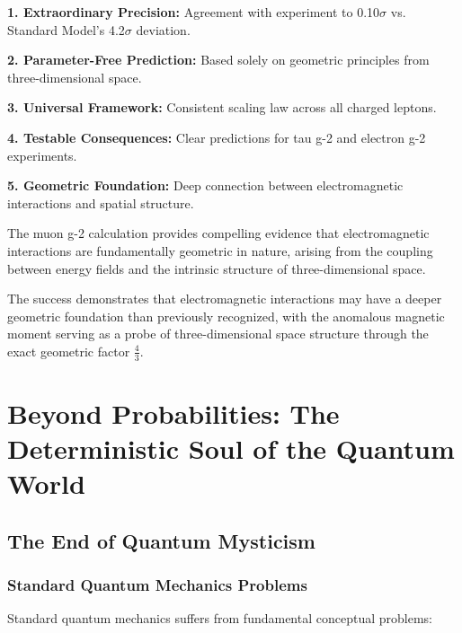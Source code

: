 \documentclass[12pt,a4paper]{report}
\begin{document}
	\textbf{1. Extraordinary Precision:}
	Agreement with experiment to 0.10$\sigma$ vs. Standard Model's 4.2$\sigma$ deviation.
	
	\textbf{2. Parameter-Free Prediction:}
	Based solely on geometric principles from three-dimensional space.
	
	\textbf{3. Universal Framework:}
	Consistent scaling law across all charged leptons.
	
	\textbf{4. Testable Consequences:}
	Clear predictions for tau g-2 and electron g-2 experiments.
	
	\textbf{5. Geometric Foundation:}
	Deep connection between electromagnetic interactions and spatial structure.
	
	\begin{tcolorbox}[colback=green!5!white,colframe=green!75!black,title=Fundamental Conclusion]
		The muon g-2 calculation provides compelling evidence that electromagnetic interactions are fundamentally geometric in nature, arising from the coupling between energy fields and the intrinsic structure of three-dimensional space.
	\end{tcolorbox}
	
	The success demonstrates that electromagnetic interactions may have a deeper geometric foundation than previously recognized, with the anomalous magnetic moment serving as a probe of three-dimensional space structure through the exact geometric factor $\frac{4}{3}$.
	
	\chapter{Beyond Probabilities: The Deterministic Soul of the Quantum World}
	\label{chap:deterministic_qm}
	
	\section{The End of Quantum Mysticism}
	\label{sec:end_quantum_mysticism}
	
	\subsection{Standard Quantum Mechanics Problems}
	\label{subsec:standard_qm_problems}
	
	Standard quantum mechanics suffers from fundamental conceptual problems:
	
\end{document}
